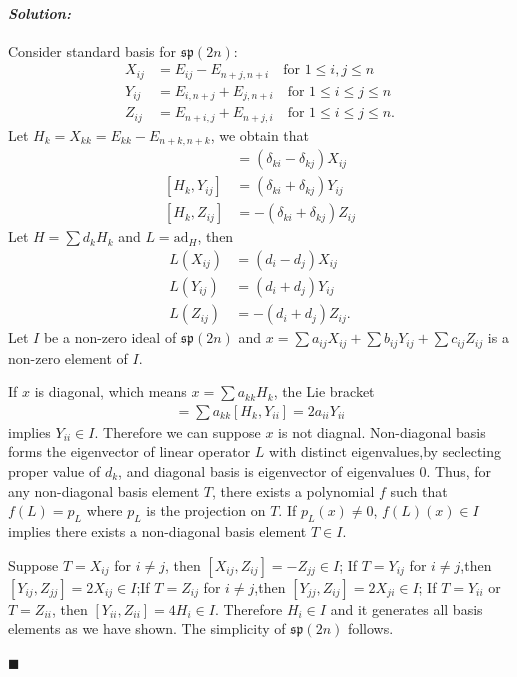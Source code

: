 \documentclass[12pt, a4paper]{article}
\newenvironment{solution}
  {\paragraph{\textit{Solution:}}\par\medskip}
  {\hfill$\blacksquare$\vspace{0.1cm}}
\begin{document}
\begin{solution}
Consider standard basis for $\mathfrak{sp}(2n)$:
\begin{align*}
  X_{ij} &= E_{ij} - E_{n+j, n+i} \quad \text{for } 1 \le i, j \le n \\
  Y_{ij} &= E_{i, n+j} + E_{j, n+i} \quad \text{for } 1 \le i \le j \le n \\
  Z_{ij} &= E_{n+i, j} + E_{n+j, i} \quad \text{for } 1 \le i \le j \le n.
\end{align*}
Let  $H_k = X_{kk} = E_{kk}-E_{n+k,n+k}$, we obtain that 
\begin{align*}
  [H_k, X_{ij}] &= (\delta_{ki} - \delta_{kj}) X_{ij} \\ 
  [H_k, Y_{ij}] &= (\delta_{ki} + \delta_{kj}) Y_{ij} \\
  [H_k, Z_{ij}] &= -(\delta_{ki} + \delta_{kj}) Z_{ij} 
\end{align*}
Let $H=\sum d_k H_k$ and $L = \text{ad}_{H}$, then
\begin{align*}
  L(X_{ij}) &= (d_i-d_j) X_{ij} \\
  L(Y_{ij}) &= (d_i+d_j) Y_{ij} \\
  L(Z_{ij}) &= -(d_i+d_j) Z_{ij}.
\end{align*}
Let $I$ be a non-zero ideal of $\mathfrak{sp}(2n)$ and $x= \sum a_{ij}X_{ij}+\sum b_{ij}Y_{ij} + \sum c_{ij} Z_{ij}$ is a non-zero element of $I$. 

If $x$ is diagonal, which means $x= \sum a_{kk} H_{k}$, the Lie bracket
\begin{align*}
  [x,Y_{ii}] = \sum a_{kk}[H_{k},Y_{ii}] = 2a_{ii}Y_{ii} 
\end{align*}
implies $Y_{ii}\in I$. Therefore we can suppose $x$ is not diagnal. Non-diagonal basis forms the eigenvector of linear operator $L$ with distinct eigenvalues,by seclecting proper value of $d_k$, and diagonal basis is eigenvector of eigenvalues 0. 
Thus, for any non-diagonal basis element $T$, there exists a polynomial $f$ such that $f(L)=p_{L}$ where $p_L$ is the projection on $T$. If $p_{L}(x)\neq 0$, $f(L)(x)\in I$ implies there exists a non-diagonal basis element $T\in I$.

Suppose $T = X_{ij}$ for $i\neq j$, then $[X_{ij},Z_{ij}] = -Z_{jj}\in I$; If $T=Y_{ij}$ for $i\neq j$,then $[Y_{ij}, Z_{jj}] = 2X_{ij} \in I$;If $T=Z_{ij}$ for $i\neq j$,then $[Y_{jj}, Z_{ij}] = 2X_{ji}\in I$; If $T=Y_{ii}$ or $T=Z_{ii}$, then $[Y_{ii},Z_{ii}] = 4H_i\in I$. Therefore $H_i\in I$ and it generates all basis elements as we have shown. The simplicity of $\mathfrak{sp}(2n)$ follows.



\end{solution}
\end{document}
